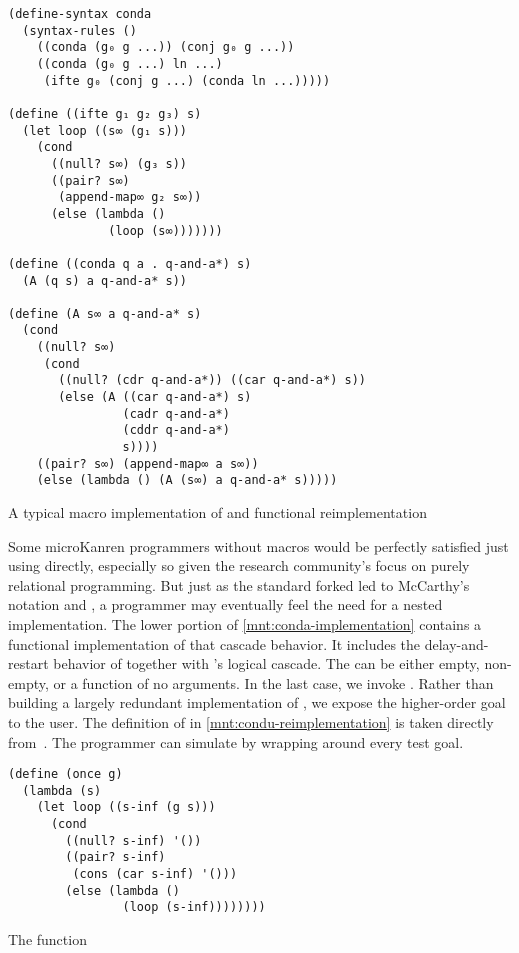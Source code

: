 \documentclass[sigplan,balance,pbalance,natbib=false]{acmart}
\begin{document}
\begin{listing}
  \begin{verbatim}
(define-syntax conda
  (syntax-rules ()
    ((conda (g₀ g ...)) (conj g₀ g ...))
    ((conda (g₀ g ...) ln ...)
     (ifte g₀ (conj g ...) (conda ln ...)))))

(define ((ifte g₁ g₂ g₃) s)
  (let loop ((s∞ (g₁ s)))
    (cond
      ((null? s∞) (g₃ s))
      ((pair? s∞)
       (append-map∞ g₂ s∞))
      (else (lambda ()
              (loop (s∞)))))))

(define ((conda q a . q-and-a*) s)
  (A (q s) a q-and-a* s))

(define (A s∞ a q-and-a* s)
  (cond
    ((null? s∞)
     (cond
       ((null? (cdr q-and-a*)) ((car q-and-a*) s))
       (else (A ((car q-and-a*) s)
                (cadr q-and-a*)
                (cddr q-and-a*)
                s))))
    ((pair? s∞) (append-map∞ a s∞))
    (else (lambda () (A (s∞) a q-and-a* s)))))
  \end{verbatim}
  \caption{A typical macro implementation of  and functional reimplementation}\label{mnt:conda-implementation}
\end{listing}



Some microKanren programmers without macros would be perfectly
satisfied just using  directly, especially so given
the research community's focus on purely relational programming. But
just as the standard forked  led to
McCarthy's  notation and , a
programmer may eventually feel the need for a nested implementation.
The lower portion of \cref{mnt:conda-implementation} contains a
functional implementation of that cascade behavior. It includes the
delay-and-restart behavior of  together
with 's logical cascade. The  can be
either empty, non-empty, or a function of no arguments. In the last
case, we invoke . Rather than building a largely
redundant implementation of , we expose the
higher-order goal  to the user. The definition
of  in \cref{mnt:condu-reimplementation} is taken
directly from~\cite{friedman2018reasoned}. The programmer can
simulate  by wrapping  around every
test goal.

\begin{listing}
  \begin{verbatim}
(define (once g)
  (lambda (s)
    (let loop ((s-inf (g s)))
      (cond
        ((null? s-inf) '())
        ((pair? s-inf)
         (cons (car s-inf) '()))
        (else (lambda ()
                (loop (s-inf))))))))
  \end{verbatim}
  \caption{The  function}\label{mnt:condu-reimplementation}
\end{listing}
\end{document}
